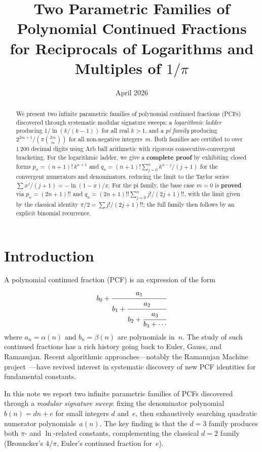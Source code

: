 \documentclass[11pt,a4paper]{article}
\title{Two Parametric Families of Polynomial Continued Fractions\\
for Reciprocals of Logarithms and Multiples of $1/\pi$}
\author{}
\date{April 2026}
\theoremstyle{plain}
\theoremstyle{remark}
\begin{document}
\maketitle

\begin{abstract}
We present two infinite parametric families of polynomial continued fractions
(PCFs) discovered through systematic modular signature sweeps:
a \emph{logarithmic ladder} producing $1/\ln(k/(k{-}1))$ for all real $k > 1$,
and a \emph{pi family} producing $2^{2m+1}/(\pi \binom{2m}{m})$ for all
non-negative integers~$m$.
Both families are certified to over $1\,200$ decimal digits using Arb ball
arithmetic with rigorous consecutive-convergent bracketing.
For the logarithmic ladder, we give a \textbf{complete proof} by exhibiting
closed forms $p_n = (n{+}1)!\,k^{n+1}$ and $q_n = (n{+}1)!\sum_{j=0}^n k^{n-j}/(j{+}1)$
for the convergent numerators and denominators, reducing the limit to
the Taylor series $\sum x^j/(j{+}1) = -\ln(1{-}x)/x$.
For the pi family, the base case $m=0$ is \textbf{proved} via
$p_n = (2n{+}1)!!$ and $q_n = (2n{+}1)!!\sum_{j=0}^n j!/(2j{+}1)!!$,
with the limit given by the classical identity
$\pi/2 = \sum j!/(2j{+}1)!!$; the full family then follows by an
explicit binomial recurrence.
\end{abstract}

\section{Introduction}

A polynomial continued fraction (PCF) is an expression of the form
\begin{equation}\label{eq:pcf}
  b_0 + \cfrac{a_1}{b_1 + \cfrac{a_2}{b_2 + \cfrac{a_3}{b_3 + \cdots}}}
\end{equation}
where $a_n = \alpha(n)$ and $b_n = \beta(n)$ are polynomials in~$n$.
The study of such continued fractions has a rich history going back to
Euler, Gauss, and Ramanujan.
Recent algorithmic approaches---notably the Ramanujan Machine
project~\cite{raayoni2021,elimelech2024}---have revived interest in
systematic discovery of new PCF identities for fundamental constants.

In this note we report two infinite parametric families of PCFs
discovered through a \emph{modular signature sweep}: fixing the
denominator polynomial $b(n) = dn + e$ for small integers $d$ and~$e$,
then exhaustively searching quadratic numerator polynomials~$a(n)$.
The key finding is that the $d=3$ family produces both $\pi$- and
$\ln$-related constants, complementing the classical $d=2$ family
(Brouncker's $4/\pi$, Euler's continued fraction for~$e$).
\end{document}
